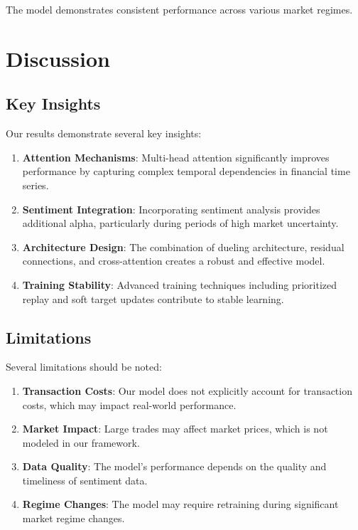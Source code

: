 \documentclass[11pt,twocolumn]{article}
\theoremstyle{definition}
\begin{document}
The model demonstrates consistent performance across various market regimes.

\section{Discussion}

\subsection{Key Insights}

Our results demonstrate several key insights:

\begin{enumerate}
\item \textbf{Attention Mechanisms}: Multi-head attention significantly improves performance by capturing complex temporal dependencies in financial time series.

\item \textbf{Sentiment Integration}: Incorporating sentiment analysis provides additional alpha, particularly during periods of high market uncertainty.

\item \textbf{Architecture Design}: The combination of dueling architecture, residual connections, and cross-attention creates a robust and effective model.

\item \textbf{Training Stability}: Advanced training techniques including prioritized replay and soft target updates contribute to stable learning.
\end{enumerate}

\subsection{Limitations}

Several limitations should be noted:

\begin{enumerate}
\item \textbf{Transaction Costs}: Our model does not explicitly account for transaction costs, which may impact real-world performance.

\item \textbf{Market Impact}: Large trades may affect market prices, which is not modeled in our framework.

\item \textbf{Data Quality}: The model's performance depends on the quality and timeliness of sentiment data.

\item \textbf{Regime Changes}: The model may require retraining during significant market regime changes.
\end{enumerate}
\end{document}
